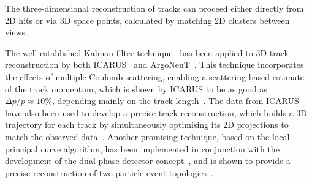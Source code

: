 
The three-dimensional reconstruction of tracks can proceed either 
directly from 2D hits or via 3D space points, 
calculated by matching 2D clusters between views.

The well-established Kalman filter technique~\cite{kalman} has been applied
to 3D track reconstruction by both ICARUS~\cite{REF1} and ArgoNeuT~\cite{REF2}.
This technique incorporates the effects of multiple Coulomb scattering,
enabling a scattering-based estimate of the track momentum,
which is shown by ICARUS to be as good as $\Delta p/p \approx 10\%$, 
depending mainly on the track length~\cite{REF3}.
The data from ICARUS have also been used to develop a precise
track reconstruction, which builds a 3D trajectory for each track by simultaneously
optimising its 2D projections to match the observed data~\cite{Antonello:2012hu}.
Another promising technique, based on the local principal curve algorithm, 
has been implemented in conjunction with the development of the 
dual-phase detector concept~\cite{REF4}, and is shown to provide 
a precise reconstruction of two-particle event topologies~\cite{REF5}. 







